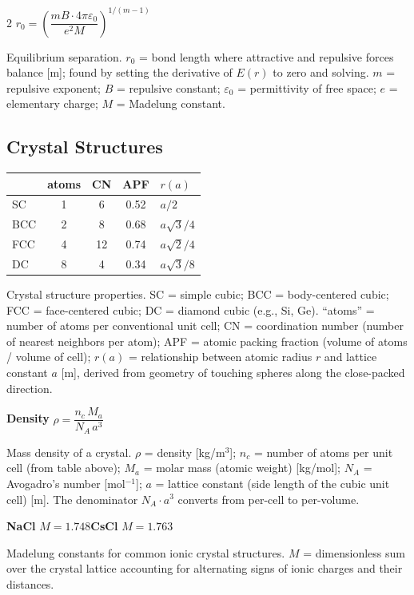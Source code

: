 \documentclass[9pt]{extarticle}
\newcommand{\eqlabel}[1]{\textbf{\scriptsize #1}\;}
\newcommand{\desc}[1]{{\small\color{desc}#1}}
\begin{document}
\begin{multicols}{2}
$r_0 = \left(\dfrac{mB\cdot 4\pi\varepsilon_0}{e^2 M}\right)^{1/(m-1)}$

\desc{Equilibrium separation. $r_0$ = bond length where attractive and repulsive forces balance [m]; found by setting the derivative of $E(r)$ to zero and solving. $m$ = repulsive exponent; $B$ = repulsive constant; $\varepsilon_0$ = permittivity of free space; $e$ = elementary charge; $M$ = Madelung constant.}

\subsection{Crystal Structures}
\renewcommand{\arraystretch}{1.15}
\begin{tabular}{@{}l c c c l@{}}
\toprule
& \small atoms & \small CN & \small APF & \small $r(a)$ \\
\midrule
SC & 1 & 6 & 0.52 & $a/2$ \\
BCC & 2 & 8 & 0.68 & $a\sqrt{3}/4$ \\
FCC & 4 & 12 & 0.74 & $a\sqrt{2}/4$ \\
DC & 8 & 4 & 0.34 & $a\sqrt{3}/8$ \\
\bottomrule
\end{tabular}
\renewcommand{\arraystretch}{1.0}

\desc{Crystal structure properties. SC = simple cubic; BCC = body-centered cubic; FCC = face-centered cubic; DC = diamond cubic (e.g., Si, Ge). ``atoms'' = number of atoms per conventional unit cell; CN = coordination number (number of nearest neighbors per atom); APF = atomic packing fraction (volume of atoms / volume of cell); $r(a)$ = relationship between atomic radius $r$ and lattice constant $a$ [m], derived from geometry of touching spheres along the close-packed direction.}

\smallskip
\eqlabel{Density} $\rho = \dfrac{n_c\,M_a}{N_A\,a^3}$

\desc{Mass density of a crystal. $\rho$ = density [kg/m$^3$]; $n_c$ = number of atoms per unit cell (from table above); $M_a$ = molar mass (atomic weight) [kg/mol]; $N_A$ = Avogadro's number [mol$^{-1}$]; $a$ = lattice constant (side length of the cubic unit cell) [m]. The denominator $N_A \cdot a^3$ converts from per-cell to per-volume.}

\eqlabel{NaCl} $M = 1.748$\quad \eqlabel{CsCl} $M = 1.763$

\desc{Madelung constants for common ionic crystal structures. $M$ = dimensionless sum over the crystal lattice accounting for alternating signs of ionic charges and their distances.}


\end{multicols}
\end{document}
